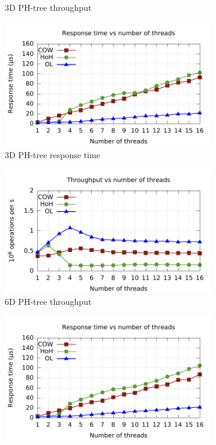 \documentclass[11pt,a4paper]{globis-book}
\begin{document}
\begin{figure}
\begin{subfigure}[b]{0.5\linewidth}
        \caption{3D PH-tree throughput}
    \end{subfigure}%
    \begin{subfigure}[b]{0.5\linewidth}
        \includegraphics[scale=0.5]{images/plots/insert3d-rt}
        \caption{3D PH-tree response time}
    \end{subfigure}
    \centering
    \begin{subfigure}[b]{0.5\linewidth}
        \includegraphics[scale=0.5]{images/plots/insert6d-tp}
        \caption{6D PH-tree throughput}
    \end{subfigure}%
    \begin{subfigure}[b]{0.5\linewidth}
        \includegraphics[scale=0.5]{images/plots/insert6d-rt}

\end{subfigure}
\end{figure}
\end{document}
